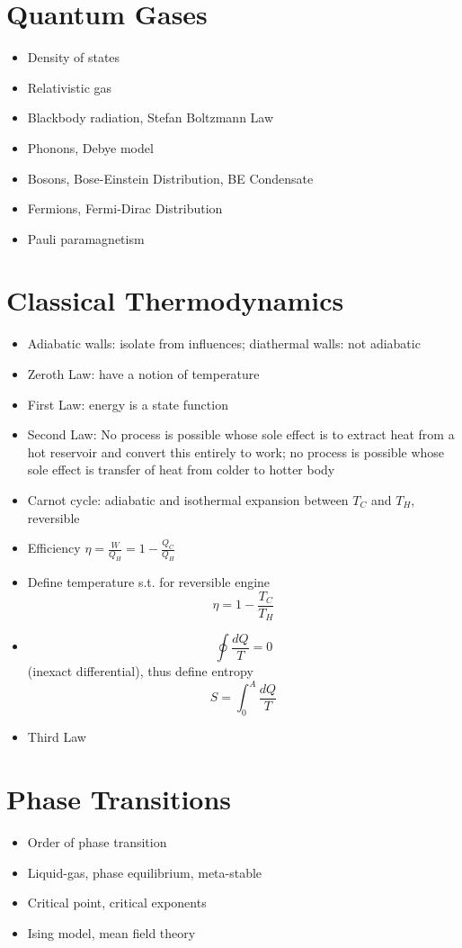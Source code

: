 \section{Quantum Gases}
\begin{itemize}
    \item Density of states
    \item Relativistic gas
    \item Blackbody radiation, Stefan Boltzmann Law
    \item Phonons, Debye model
    \item Bosons, Bose-Einstein Distribution, BE Condensate 
    \item Fermions, Fermi-Dirac Distribution
    \item Pauli paramagnetism
\end{itemize}
\section{Classical Thermodynamics}
\begin{itemize}
    \item Adiabatic walls: isolate from influences; diathermal walls: not adiabatic
    \item Zeroth Law: have a notion of temperature
    \item First Law: energy is a state function
    \item Second Law: No process is possible whose sole effect is to extract heat from a hot reservoir and convert this entirely to work; no process is possible whose sole effect is transfer of heat from colder to hotter body
    \item Carnot cycle: adiabatic and isothermal expansion between $T_C$ and $T_H$, reversible
    \item Efficiency $\eta = \frac{W}{Q_H} =  1-\frac{Q_C}{Q_H}$
    \item Define temperature s.t. for reversible engine \[\eta = 1-\frac{T_C}{T_H}\]
    \item \[\oint \frac{dQ}{T} = 0\] (inexact differential), thus define entropy \[S = \int_0^A \frac{dQ}{T} \]
    \item Third Law
\end{itemize}
\section{Phase Transitions}
\begin{itemize}
    \item Order of phase transition
    \item Liquid-gas, phase equilibrium, meta-stable
    \item Critical point, critical exponents
    \item Ising model, mean field theory
\end{itemize}
